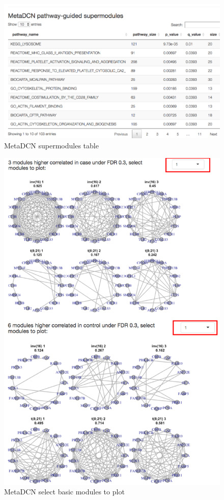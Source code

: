\begin{figure}[H]
\begin{center}
\includegraphics[scale=0.45]{./figure/metaDCN/metaDCNsuper.png}
\caption{MetaDCN supermodules table}
\label{fig:metaDCNsuper}
\end{center}
\end{figure}

\begin{figure}[H]
\begin{center}
\includegraphics[scale=0.45]{./figure/metaDCN/metaDCNBMplot.png}
\caption{MetaDCN select basic modules to plot}
\label{fig:metaDCNBMplot}
\end{center}
\end{figure}
